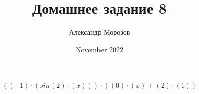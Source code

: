 \documentclass{article}
\title{Домашнее задание 8}
\author{Александр Морозов}
\date{November 2022}
\begin{document}
    \[{({({-1})\cdot({sin{({2})\cdot({x})}})})\cdot({{({0})\cdot({x})}+{({2})\cdot({1})}})}\]

	
\end{document}
